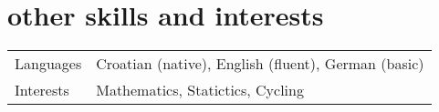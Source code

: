 \documentclass[a4paper]{article}
\makeatletter
\newlength{\tablewidth}
\newenvironment{skills}{%
\setlength{\tablewidth}{\linewidth}
\addtolength{\tablewidth}{-2\tabcolsep}
\begin{tabular}{@{}p{0.15\tablewidth}p{0.85\tablewidth}@{}}
}{%
\end{tabular}
}
\makeatother
\begin{document}
\section{other skills and interests}
\begin{skills}
    Languages & Croatian (native), English (fluent), German (basic) \\
    Interests & Mathematics, Statictics, Cycling \\
\end{skills}
\end{document}
